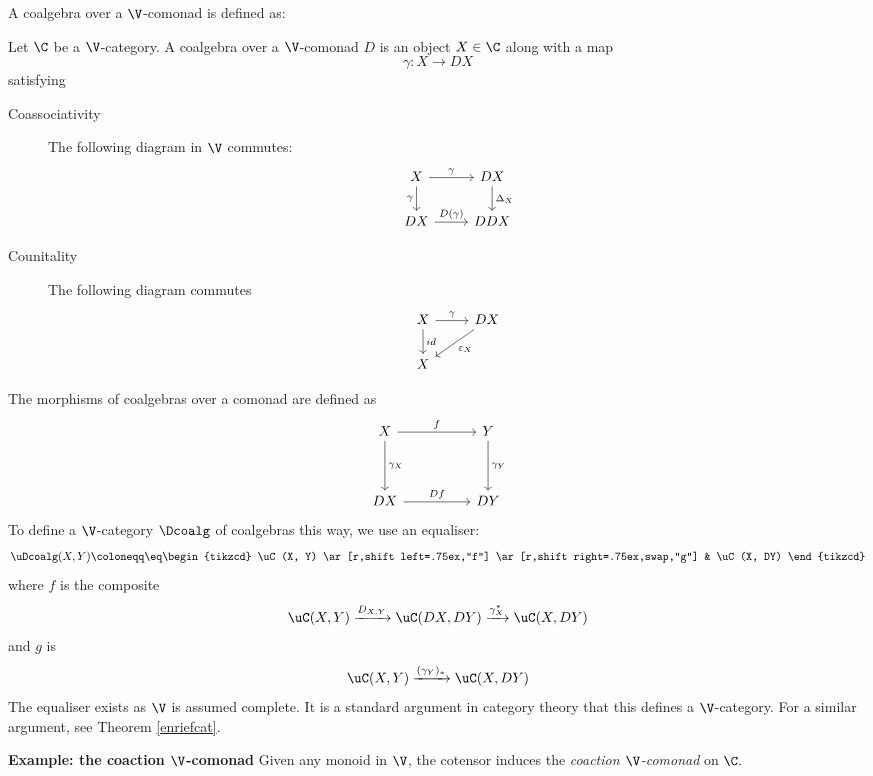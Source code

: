 \documentclass{tac}
\begin{document}
A coalgebra over a $\V$-comonad is defined as:
\begin{definition}
    Let $\C$ be a $\V$-category. A coalgebra over a $\V$-comonad $D$ is an object $X\in \C$ along with a map 
    $$
    \gamma: X \to DX
    $$
    satisfying
    \begin{description}
        \item[Coassociativity] The following diagram in $\V$ commutes:
        $$
        \begin{tikzcd}
        X \arrow[r, "\gamma"] \arrow[d, "\gamma"'] & DX \arrow[d, "\Delta_X"] \\
        DX \arrow[r, "D(\gamma)"] & DDX 
        \end{tikzcd}
        $$

        \item[Counitality] The following diagram commutes
        $$
        \begin{tikzcd}
            X \dar{id} \rar{\gamma} & DX  \arrow[dl, "\varepsilon_X"]
            \\
            X
        \end{tikzcd}
        $$
    \end{description}
\end{definition}
The morphisms of coalgebras over a comonad are defined as 
$$
\begin{tikzcd}
X \arrow[rr, "f"] \arrow[dd, "\gamma_X"] &  & Y \arrow[dd, "\gamma_Y"] \\
                                         &  &                          \\
DX \arrow[rr, "Df"]                      &  & DY                      
\end{tikzcd}
$$
To define a $\V$-category $\Dcoalg$ of coalgebras this way, we use an equaliser:
$$
\uDcoalg(X, Y) \coloneqq \eq \begin{tikzcd}
\uC(X, Y) \ar[r,shift left=.75ex,"f"]
  \ar[r,shift right=.75ex,swap,"g"]
&
\uC(X, DY)
\end{tikzcd}
$$
where $f$ is the composite
$$
\uC(X, Y) \xrightarrow{D_{X, Y}} \uC(DX, DY)  \xrightarrow{\gamma_X^{\ast}}\uC(X, DY)
$$
and $g$ is 
$$
\uC(X, Y) \xrightarrow{(\gamma_Y)_\ast}\uC(X, DY)
$$
The equaliser exists as $\V$ is assumed complete. It is a standard argument in  category theory that this defines a  $\V$-category.  For a similar argument, see Theorem \ref{enriefcat}.

\medskip



\noindent\textbf{Example: the coaction $\V$-comonad} Given any monoid in $\V$, the cotensor induces the \emph{coaction $\V$-comonad} on $\C.$
\end{document}
